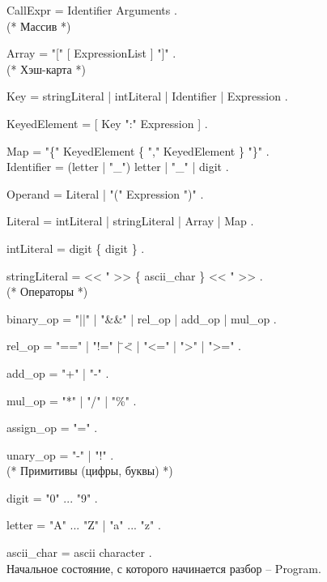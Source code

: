 CallExpr = Identifier Arguments . \\


(* Массив *)

Array = "{}["{} [ ExpressionList ] "{}]"{} . \\


(* Хэш-карта *)

Key = stringLiteral | intLiteral | Identifier | Expression .

KeyedElement  = [ Key "{}:"{} Expression ] .

Map = "{}\{"{} KeyedElement \{ "{},"{} KeyedElement \} "{}\}"{} . \\


Identifier = (letter | "{}\_"{}) { letter | "{}\_"{} | digit } .

Operand = Literal | "{}("{} Expression "{})"{} .

Literal = intLiteral | stringLiteral | Array | Map .

intLiteral = digit \{ digit \} .

stringLiteral = << "{} >> \{ ascii\_char \} << "{} >> . \\


(* Операторы *)

binary\_op = "{}||"{} | "{}\&\&"{} | rel\_op | add\_op | mul\_op .

rel\_op = "{}=="{} | "{}!="{} | \"{}<\"{} | "{}<="{} | "{}>"{} | "{}>="{} .

add\_op = "{}+"{} | "{}-"{} .

mul\_op = "{}*"{} | "{}/"{} | "{}\%"{} .

assign\_op = "{}="{} .

unary\_op = "{}-"{} | "{}!"{} . \\


(* Примитивы (цифры, буквы) *)

digit = "{}0"{} ... "{}9"{} .

letter = "{}A"{} ... "{}Z"{} | "{}a"{} ... "{}z"{} .

ascii\_char = ascii character . \\

Начальное состояние, с которого начинается разбор -- Program.

